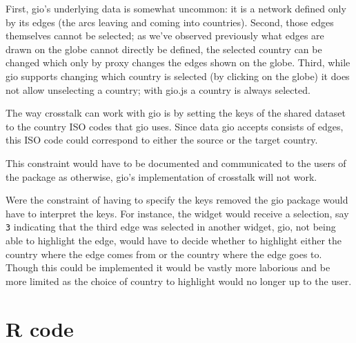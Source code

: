 \documentclass[
  10pt,
]{krantz}
\makeatletter
\newenvironment{Shaded}{\begin{snugshade}}{\end{snugshade}}
\newcommand{\CommentTok}[1]{\textcolor[rgb]{0.37,0.37,0.37}{\textit{#1}}}
\newcommand{\DataTypeTok}[1]{\textcolor[rgb]{0.27,0.27,0.27}{#1}}
\newcommand{\KeywordTok}[1]{\textcolor[rgb]{0.27,0.27,0.27}{\textbf{#1}}}
\newcommand{\NormalTok}[1]{#1}
\newcommand{\OperatorTok}[1]{\textcolor[rgb]{0.43,0.43,0.43}{\textbf{#1}}}
\newcommand{\StringTok}[1]{\textcolor[rgb]{0.5,0.5,0.5}{#1}}
\newenvironment{kframe}{%
\medskip{}
\setlength{\fboxsep}{.8em}
 \def\at@end@of@kframe{}%
 \ifinner\ifhmode%
  \def\at@end@of@kframe{\end{minipage}}%
  \begin{minipage}{\columnwidth}%
 \fi\fi%
 \def\FrameCommand##1{\hskip\@totalleftmargin \hskip-\fboxsep
 \colorbox{shadecolor}{##1}\hskip-\fboxsep
     \hskip-\linewidth \hskip-\@totalleftmargin \hskip\columnwidth}%
 \MakeFramed {\advance\hsize-\width
   \@totalleftmargin\z@ \linewidth\hsize
   \@setminipage}}%
 {\par\unskip\endMakeFramed%
 \at@end@of@kframe}
\renewenvironment{Shaded}{\begin{kframe}}{\end{kframe}}
\makeatother
\begin{document}
First, gio's underlying data is somewhat uncommon: it is a network defined only by its edges (the arcs leaving and coming into countries). Second, those edges themselves cannot be selected; as we've observed previously what edges are drawn on the globe cannot directly be defined, the selected country can be changed which only by proxy changes the edges shown on the globe. Third, while gio supports changing which country is selected (by clicking on the globe) it does not allow unselecting a country; with gio.js a country is always selected.

The way crosstalk can work with gio is by setting the keys of the shared dataset to the country ISO codes that gio uses. Since data gio accepts consists of edges, this ISO code could correspond to either the source or the target country.

\begin{Shaded}
\end{Shaded}

This constraint would have to be documented and communicated to the users of the package as otherwise, gio's implementation of crosstalk will not work.

Were the constraint of having to specify the keys removed the gio package would have to interpret the keys. For instance, the widget would receive a selection, say \texttt{3} indicating that the third edge was selected in another widget, gio, not being able to highlight the edge, would have to decide whether to highlight either the country where the edge comes from or the country where the edge goes to. Though this could be implemented it would be vastly more laborious and be more limited as the choice of country to highlight would no longer up to the user.

\hypertarget{linking-widgets-r}{%
\section{R code}\label{linking-widgets-r}}
\end{document}
